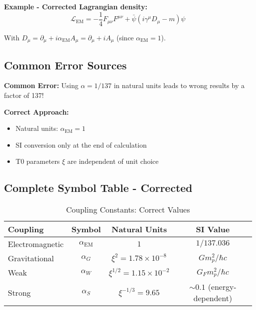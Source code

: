 \documentclass[12pt,a4paper]{report}
\begin{document}
\textbf{Example - Corrected Lagrangian density:}
\begin{equation}
	\mathcal{L}_{\text{EM}} = -\frac{1}{4}F_{\mu\nu}F^{\mu\nu} + \bar{\psi}(i\gamma^\mu D_\mu - m)\psi
\end{equation}

With $D_\mu = \partial_\mu + i \alpha_{\text{EM}} A_\mu = \partial_\mu + i A_\mu$ (since $\alpha_{\text{EM}} = 1$).

\subsection{Common Error Sources}
\label{subsec:common_errors}

\begin{tcolorbox}[colback=yellow!10!white,colframe=orange!75!black,title=WARNING]
	\textbf{Common Error:}
	Using $\alpha = 1/137$ in natural units leads to wrong results by a factor of 137!
	
	\textbf{Correct Approach:}
	\begin{itemize}
		\item Natural units: $\alpha_{\text{EM}} = 1$
		\item SI conversion only at the end of calculation
		\item T0 parameters $\xi$ are independent of unit choice
	\end{itemize}
\end{tcolorbox}

\subsection{Complete Symbol Table - Corrected}
\label{subsec:corrected_symbol_table}

\begin{table}[h!]
	\centering
	\caption{Coupling Constants: Correct Values}
	\begin{tabular}{|l|c|c|c|}
		\hline
		\textbf{Coupling} & \textbf{Symbol} & \textbf{Natural Units} & \textbf{SI Value} \\
		\hline
		Electromagnetic & $\alpha_{\text{EM}}$ & $1$ & $1/137.036$ \\
		Gravitational & $\alpha_G$ & $\xi^2 = 1.78 \times 10^{-8}$ & $G m_p^2/\hbar c$ \\
		Weak & $\alpha_W$ & $\xi^{1/2} = 1.15 \times 10^{-2}$ & $G_F m_p^2/\hbar c$ \\
		Strong & $\alpha_S$ & $\xi^{-1/3} = 9.65$ & $\sim 0.1$ (energy-dependent) \\
		\hline
	\end{tabular}
\end{table}
\end{document}

